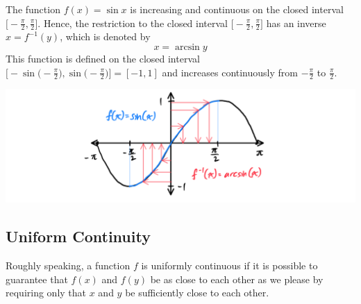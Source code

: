     \begin{example}
      The function $f(x) = \sin{x}$ is increasing and continuous on the closed interval $\big[ -\frac{\pi}{2}, \frac{\pi}{2} \big]$. Hence, the restriction to the closed interval $\big[ -\frac{\pi}{2}, \frac{\pi}{2} \big]$ has an inverse $x = f^{-1}(y)$, which is denoted by 
      \[x = \arcsin{y}\]
      This function is defined on the closed interval $\big[- \sin\big(-\frac{\pi}{2}\big), \sin\big(-\frac{\pi}{2}\big) \big] = [-1,1]$ and increases continuously from $-\frac{\pi}{2}$ to $\frac{\pi}{2}$. 
      \begin{center}
          \includegraphics[scale=0.25]{img/Inverse_Function_Theorem_Sin.PNG}
      \end{center}
    \end{example}

\subsection{Uniform Continuity}

  Roughly speaking, a function $f$ is uniformly continuous if it is possible to guarantee that $f(x)$ and $f(y)$ be as close to each other as we please by requiring only that $x$ and $y$ be sufficiently close to each other. 

